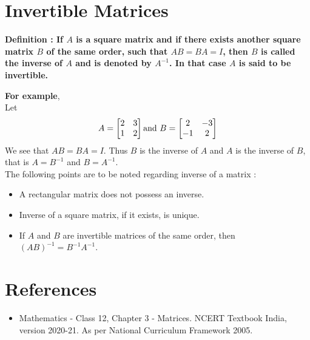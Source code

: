 \documentclass[12pt, letterpaper]{article}
\begin{document}
\section{Invertible Matrices}
\begin{displayquote}
\textbf{Definition : If $A$ is a square matrix and if there exists another square matrix $B$ of the same order, such that $AB = BA = I$, then $B$ is called the inverse of $A$ and is denoted by $A^{-1}$. In that case $A$ is said to be invertible.}
\end{displayquote}
\textbf{For example},\\
Let 
\begin{displaymath}
A = \begin{bmatrix}
2 & 3\\
1 & 2
\end{bmatrix} \textnormal{and} \ B = \begin{bmatrix}
2 & -3\\
-1 & 2
\end{bmatrix}
\end{displaymath}
We see that $AB = BA = I$. Thus $B$ is the inverse of $A$ and $A$ is the inverse of $B$, that is $A = B^{-1}$ and $B = A^{-1}$.\\
The following points are to be noted regarding inverse of a matrix : 
\begin{itemize}
    \item A rectangular matrix does not possess an inverse. 
    \item Inverse of a square matrix, if it exists, is unique.
    \item If $A$ and $B$ are invertible matrices of the same order, then $(AB)^{-1} = B^{-1}A^{-1}$.
\end{itemize}

\section{References}
\begin{itemize}
    \item Mathematics - Class 12, Chapter 3 - Matrices. NCERT Textbook India, version 2020-21. As per National Curriculum Framework 2005.
\end{itemize}
\end{document}
